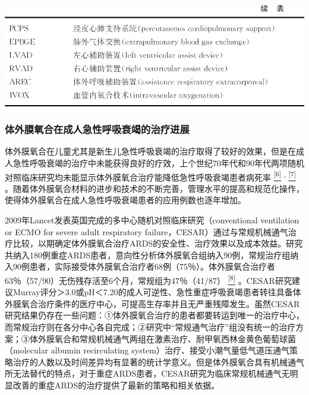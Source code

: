 \begin{center}
\includegraphics{./images/Image00280.jpg}
\end{center}

\subsubsection{体外膜氧合在成人急性呼吸衰竭的治疗进展}

体外膜氧合在儿童尤其是新生儿急性呼吸衰竭的治疗取得了较好的效果，但是在成人急性呼吸衰竭的治疗中未能获得良好的疗效，上个世纪70年代和90年代两项随机对照临床研究均未能显示体外膜氧合治疗能降低急性呼吸衰竭患者病死率
\protect\hyperlink{text00030.htmlux5cux23ch6-29}{\textsuperscript{{[}6{]}}}
\textsuperscript{,}
\protect\hyperlink{text00030.htmlux5cux23ch7-29}{\textsuperscript{{[}7{]}}}
。随着体外膜氧合材料的进步和技术的不断完善，管理水平的提高和规范化操作，使得体外膜氧合在成人急性呼吸衰竭患者的应用例数也逐年增加。

2009年Lancet发表英国完成的多中心随机对照临床研究（conventional
ventilation or ECMO for severe adult respiratory
failure，CESAR）通过与常规机械通气治疗比较，以期确定体外膜氧合治疗ARDS的安全性、治疗效果以及成本效益。研究共纳入180例重症ARDS患者，意向性分析体外膜氧合组纳入90例，常规治疗组纳入90例患者，实际接受体外膜氧合治疗者68例（75％）。体外膜氧合治疗者63％（57/90）无伤残存活至6个月，常规组为47％（41/87）
\protect\hyperlink{text00030.htmlux5cux23ch8-29}{\textsuperscript{{[}8{]}}}
。CESAR研究建议Murray评分＞3.0或pH＜7.20的成人可逆性、急性重症呼吸衰竭患者转往具备体外膜氧合治疗条件的医疗中心，可提高生存率并且无严重残障发生。虽然CESAR研究结果仍存在一些问题：①体外膜氧合治疗的患者都要转运到唯一的治疗中心，而常规治疗则在各分中心各自完成；②研究中“常规通气治疗”组没有统一的治疗方案；③体外膜氧合和常规机械通气两组在激素治疗、耐甲氧西林金黄色葡萄球菌（molecular
albumin recirculating
system）治疗、接受小潮气量低气道压通气策略治疗的人数以及时间差异均有显著的统计学意义。但是体外膜氧合具有机械通气所无法替代的特点，对于重症ARDS患者，CESAR研究为临床常规机械通气无明显改善的重症ARDS的治疗提供了最新的策略和相关依据。

